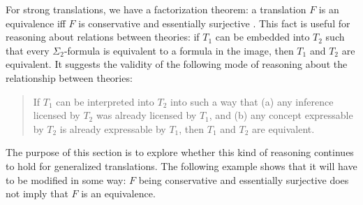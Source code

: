 \documentclass[12pt]{article}
\theoremstyle{definition}
\theoremstyle{remark}
\newcommand{\3}{\mathcal}
\begin{document}
For strong translations, we have a factorization theorem: a
translation $F$ is an equivalence iff $F$ is conservative and
essentially surjective \citep[Props.\ 4.5.26, 4.5.27]{tlps}. This fact
is useful for reasoning about relations between theories: if $T_1$ can
be embedded into $T_2$ such that every $\Sigma _2$-formula is
equivalent to a formula in the image, then $T_1$ and $T_2$ are
equivalent. It suggests the validity of the following mode of
reasoning about the relationship between theories:
\begin{quote}
  If $T_1$ can be interpreted into $T_2$ into such a way that (a) any
  inference licensed by $T_2$ was already licensed by $T_1$, and (b)
  any concept expressable by $T_2$ is already expressable by $T_1$,
  then $T_1$ and $T_2$ are equivalent. \end{quote} The purpose of this
section is to explore whether this kind of reasoning continues to hold
for generalized translations. The following example shows that it will
have to be modified in some way: $F$ being conservative and
essentially surjective does not imply that $F$ is an equivalence.
\end{document}
